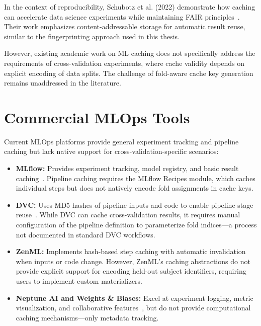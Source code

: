 \documentclass{imc-inf} %
\begin{document}
In the context of reproducibility, Schubotz et al. (2022) demonstrate how 
caching can accelerate data science experiments while maintaining FAIR 
principles~\cite{schubotz2022caching}. Their work emphasizes content-addressable 
storage for automatic result reuse, similar to the fingerprinting approach 
used in this thesis.

However, existing academic work on ML caching does not specifically address 
the requirements of cross-validation experiments, where cache validity depends 
on explicit encoding of data splits. The challenge of fold-aware cache key 
generation remains unaddressed in the literature.

\section{Commercial MLOps Tools}

Current MLOps platforms provide general experiment tracking and pipeline 
caching but lack native support for cross-validation-specific scenarios:

\begin{itemize}
\item \textbf{MLflow:} Provides experiment tracking, model registry, and 
      basic result caching~\cite{zaharia2018mlflow}. Pipeline caching requires 
      the MLflow Recipes module, which caches individual steps but does not 
      natively encode fold assignments in cache keys.

\item \textbf{DVC:} Uses MD5 hashes of pipeline inputs and code to enable 
      pipeline stage reuse~\cite{dvc2022inproceedings}. While DVC can cache 
      cross-validation results, it requires manual configuration of the pipeline 
      definition to parameterize fold indices—a process not documented in 
      standard DVC workflows.

\item \textbf{ZenML:} Implements hash-based step caching with automatic 
      invalidation when inputs or code change. However, ZenML's caching 
      abstractions do not provide explicit support for encoding held-out 
      subject identifiers, requiring users to implement custom materializers.

\item \textbf{Neptune AI and Weights \& Biases:} Excel at experiment logging, 
      metric visualization, and collaborative features~\cite{neptune2024docs,wandb2024docs}, 
      but do not provide computational caching mechanisms—only metadata tracking.
\end{itemize}
\end{document}

